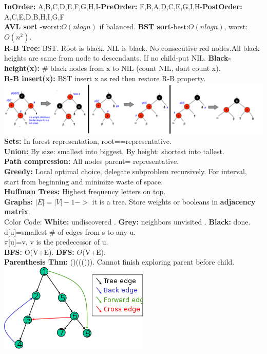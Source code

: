 \documentclass[paper=a4, fontsize=10pt]{scrartcl} %
\begin{document}
\textbf{InOrder: }A,B,C,D,E,F,G,H,I-\textbf{PreOrder:} F,B,A,D,C,E,G,I,H-\textbf{PostOrder: }A,C,E,D,B,H,I,G,F\\
\textbf{AVL sort} -worst:$O(nlogn)$ if balanced. \textbf{BST sort}-best:$O(nlogn)$, worst:$O(n^2)$.\\
\textbf{R-B Tree:} BST. Root is black. NIL is black. No consecutive red nodes.All black heights are same from node to descendants. If no child-put NIL. \textbf{Black-height(x):} \# black nodes from x to NIL (count NIL, dont count x).\\
\textbf{R-B insert(x): } BST insert x as red then restore R-B property.\\
\includegraphics[scale=0.6]{RB-fix.png}\\
\textbf{Sets: }In forest representation, root==representative.\\
\textbf{Union: }By size: smallest into biggest. By height: shortest into tallest.\\
\textbf{Path compression: }All nodes parent= representative.\\
\textbf{Greedy: } Local optimal choice, delegate subproblem recursively. For interval, start from beginning and minimize waste of space.\\
\textbf{Huffman Trees: } Highest frequency letters on top.\\
\textbf{Graphs: }$|E|=|V|-1 ->$ it is a tree. Store weights or booleans in \textbf{adjacency matrix}.\\
Color Code: \textbf{White:} undiscovered . \textbf{Grey:} neighbors unvisited . \textbf{Black:} done.\\
d[u]=smallest \# of edges from s to any u.\\
$\pi$[u]=v, v is the predecessor of u.\\
\textbf{BFS:} O(V+E). \textbf{DFS:} $\Theta$(V+E).\\
\textbf{Parenthesis Thm:} ()((())). Cannot finish exploring parent before child.\\
\includegraphics{edges.png}
\end{document}
